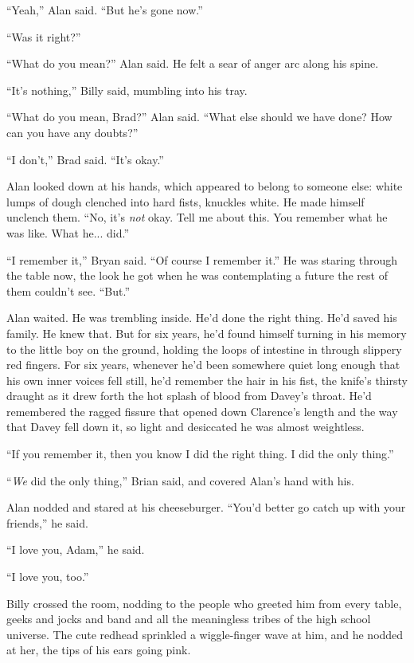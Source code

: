 ``Yeah,'' Alan said.  ``But he's gone now.''

``Was it right?''

``What do you mean?'' Alan said.  He felt a sear of anger arc along
his spine.

``It's nothing,'' Billy said, mumbling into his tray.

``What do you mean, Brad?'' Alan said.  ``What else should we have
done?  How can you have any doubts?''

``I don't,'' Brad said.  ``It's okay.''

Alan looked down at his hands, which appeared to belong to someone
else:  white lumps of dough clenched into hard fists, knuckles white. 
He made himself unclench them.  ``No, it's \textit{not} okay.  Tell me
about this.  You remember what he was like.  What he...  did.''

``I remember it,'' Bryan said.  ``Of course I remember it.'' He was
staring through the table now, the look he got when he was
contemplating a future the rest of them couldn't see.  ``But.''

Alan waited.  He was trembling inside.  He'd done the right thing. 
He'd saved his family.  He knew that.  But for six years, he'd found
himself turning in his memory to the little boy on the ground, holding
the loops of intestine in through slippery red fingers.  For six
years, whenever he'd been somewhere quiet long enough that his own
inner voices fell still, he'd remember the hair in his fist, the
knife's thirsty draught as it drew forth the hot splash of blood from
Davey's throat.  He'd remembered the ragged fissure that opened down
Clarence's length and the way that Davey fell down it, so light and
desiccated he was almost weightless.

``If you remember it, then you know I did the right thing.  I did the
only thing.''

``\textit{We} did the only thing,'' Brian said, and covered Alan's
hand with his.

Alan nodded and stared at his cheeseburger.  ``You'd better go catch
up with your friends,'' he said.

``I love you, Adam,'' he said.

``I love you, too.''

Billy crossed the room, nodding to the people who greeted him from
every table, geeks and jocks and band and all the meaningless tribes
of the high school universe.  The cute redhead sprinkled a
wiggle-finger wave at him, and he nodded at her, the tips of his ears
going pink.

